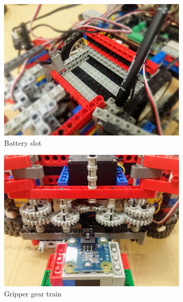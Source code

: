 \begin{figure}[ht]
\begin{subfigure}{0.4\textwidth}
        \includegraphics[width=\linewidth]{res/robot-pics/battery-slot.jpg}
        \caption{Battery slot}
    \end{subfigure}
    \medskip
    \begin{subfigure}{0.4\textwidth}
        \includegraphics[width=\linewidth]{res/robot-pics/gripper-gear-train.jpg}
        \caption{Gripper gear train}
    \end{subfigure}
    \begin{subfigure}{0.4\textwidth}

\end{subfigure}
\end{figure}
